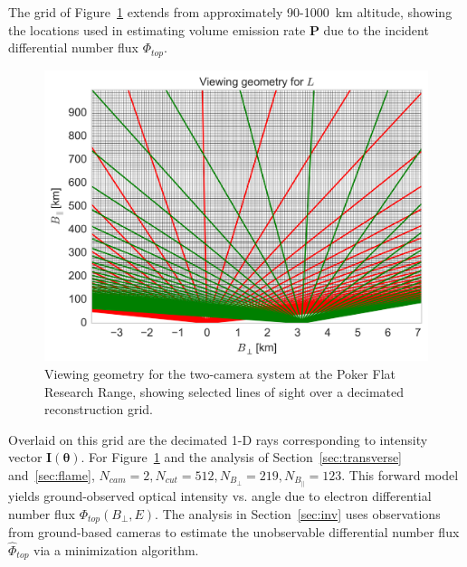 The grid of Figure~\ref{fig:Lcam} extends from approximately 90-1000~km altitude, showing the locations used in estimating volume emission rate $\mathbf{P}$ due to the incident differential number flux $\Phi_{top}$.
\begin{figure}
\includegraphics[width=\columnwidth,trim=5 6 5 5,clip]{gfx/Lcam}
\caption{Viewing geometry for the two-camera system at the Poker Flat Research Range, showing selected lines of sight over a decimated reconstruction grid.}\label{fig:Lcam}
\end{figure}
Overlaid on this grid are the decimated 1-D rays corresponding to intensity vector $\mathbf{I(\theta)}$.
For Figure~\ref{fig:Lcam} and the analysis of Section~\ref{sec:transverse} and~\ref{sec:flame}, $N_{cam}=2, N_{cut}=512, N_{B_\perp}=219, N_{B_\parallel}=123$.
This forward model yields ground-observed optical intensity vs. angle due to electron differential number flux $\Phi_{top}(B_\perp,E)$. 
The analysis in Section~\ref{sec:inv} uses observations from ground-based cameras to estimate the unobservable differential number flux $\hat{\Phi}_{top}$ via a minimization algorithm. 
